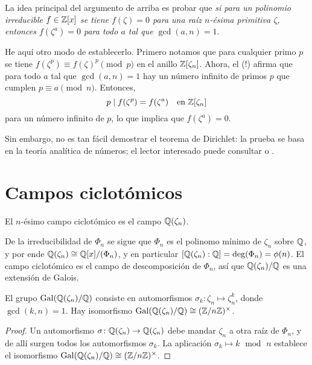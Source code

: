 \begin{comentario}
  La idea principal del argumento de arriba es probar que \emph{si para un
    polinomio irreducible $f \in \mathbb{Z} [x]$ se tiene $f (\zeta) = 0$ para una raíz
    $n$-ésima primitiva $\zeta$, entonces $f (\zeta^a) = 0$ para todo $a$ tal
    que $\gcd (a,n) = 1$}.

  He aquí otro modo de establecerlo. Primero notamos que para cualquier primo
  $p$ se tiene $f (\zeta^p) \equiv f (\zeta)^p \pmod{p}$ en el anillo $\mathbb{Z}
  [\zeta_n]$. Ahora, el  (!) afirma que para todo $a$ tal que $\gcd (a,n) = 1$ hay un
  número infinito de primos $p$ que cumplen $p \equiv a \pmod{n}$. Entonces,
  $$p \mid f (\zeta^p) = f (\zeta^a) \quad \text{en }\mathbb{Z} [\zeta_n]$$
  para un número infinito de $p$, lo que implica que $f (\zeta^a) = 0$.

  Sin embargo, no es tan fácil demostrar el teorema de Dirichlet: la prueba se
  basa en la teoría analítica de números; el lector interesado puede consultar
  \cite[Chapter~16]{Ireland-Rosen} o \cite[Chapter~7]{Apostol-analytic}.
\end{comentario}


\section{Campos ciclotómicos}
\label{sec:campos-ciclotomicos}

\begin{definicion}
  El $n$-ésimo campo ciclotómico es el campo $\mathbb{Q} (\zeta_n)$.
\end{definicion}

De la irreducibilidad de $\Phi_n$ se sigue que $\Phi_n$ es el polinomo mínimo de
$\zeta_n$ sobre $\mathbb{Q}$, y por ende $\mathbb{Q} (\zeta_n) \cong \mathbb{Q} [x] / (\Phi_n)$, y en
particular $[\mathbb{Q} (\zeta_n) : \mathbb{Q}] = \deg (\Phi_n) = \phi (n)$. El campo
ciclotómico es el campo de descomposición de $\Phi_n$, así que
$\mathbb{Q} (\zeta_n)/\mathbb{Q}$ es una extensión de Galois.

\begin{proposicion}
  El grupo $\operatorname{Gal} (\mathbb{Q}(\zeta_n)/\mathbb{Q})$ consiste en automorfismos
  $\sigma_k\colon \zeta_n \mapsto \zeta_n^k$, donde $\gcd (k,n) = 1$.
  Hay isomorfismo $\operatorname{Gal} (\mathbb{Q} (\zeta_n)/\mathbb{Q}) \cong (\mathbb{Z}/n\mathbb{Z})^\times$.

  \begin{proof}
    Un automorfismo $\sigma\colon \mathbb{Q}(\zeta_n) \to \mathbb{Q}(\zeta_n)$ debe mandar
    $\zeta_n$ a otra raíz de $\Phi_n$, y de allí surgen todos los automorfismos
    $\sigma_k$. La aplicación $\sigma_k \mapsto k\operatorname{~mod~}n$
    establece el isomorfismo $\operatorname{Gal} (\mathbb{Q} (\zeta_n)/\mathbb{Q}) \cong (\mathbb{Z}/n\mathbb{Z})^\times$.
  \end{proof}
\end{proposicion}

